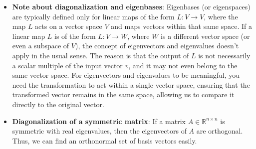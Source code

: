 \documentclass{report}
\begin{document}
\begin{itemize}
        \item \textbf{Note about diagonalization and eigenbases}: Eigenbases (or eigenspaces) are typically defined only for linear maps of the form 
            \( L: V \to V \), where the map \( L \) acts on a vector space \( V \) and maps vectors within that same space. 
            \bigbreak \noindent 
            If a linear map \( L \) is of the form \( L: V \to W \), where \( W \) is a different vector space (or even a subspace of \( V \)), the concept of eigenvectors and eigenvalues doesn’t apply in the usual sense. The reason is that the output of \( L \) is not necessarily a scalar multiple of the input vector \( v \), and it may not even belong to the same vector space.
            \bigbreak \noindent 
            For eigenvectors and eigenvalues to be meaningful, you need the transformation to act within a single vector space, ensuring that the transformed vector remains in the same space, allowing us to compare it directly to the original vector.
        \item \textbf{Diagonalization of a symmetric matrix}: If a matrix $A \in \mathbb{R}^{n\times n}$ is symmetric with real eigenvalues, then the eigenvectors of $A$ are orthogonal.
            \bigbreak \noindent 
            Thus, we can find an orthonormal set of basis vectors easily.

    \end{itemize}
\end{document}
